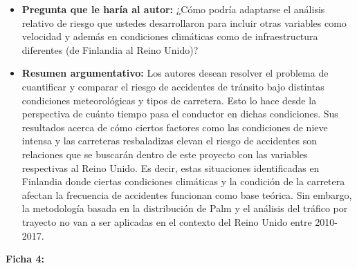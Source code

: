 \documentclass[12pt]{article}
\begin{document}
\begin{itemize}
	\item \textbf{Pregunta que le haría al autor:} ¿Cómo podría adaptarse el análisis relativo de riesgo que ustedes desarrollaron para incluir otras variables como velocidad y además en condiciones climáticas como de infraestructura diferentes (de Finlandia al Reino Unido)?    
 
	\item \textbf{Resumen argumentativo:} Los autores desean resolver el problema de cuantificar y comparar el riesgo de accidentes de tránsito bajo distintas condiciones meteorológicas y tipos de carretera. Esto lo hace desde la perspectiva de cuánto tiempo pasa el conductor en dichas condiciones. Sus resultados acerca de cómo ciertos factores como las condiciones de nieve intensa y las carreteras resbaladizas elevan el riesgo de accidentes son relaciones que se buscarán dentro de este proyecto con las variables respectivas al Reino Unido. Es decir, estas situaciones identificadas en Finlandia donde ciertas condiciones climáticas y la condición de la carretera afectan la frecuencia de accidentes funcionan como base teórica. Sin embargo, la metodología basada en la distribución de Palm y el análisis del tráfico por trayecto no van a ser aplicadas en el contexto del Reino Unido entre 2010-2017. \\  
\end{itemize}

\textbf{Ficha 4:}
\end{document}
